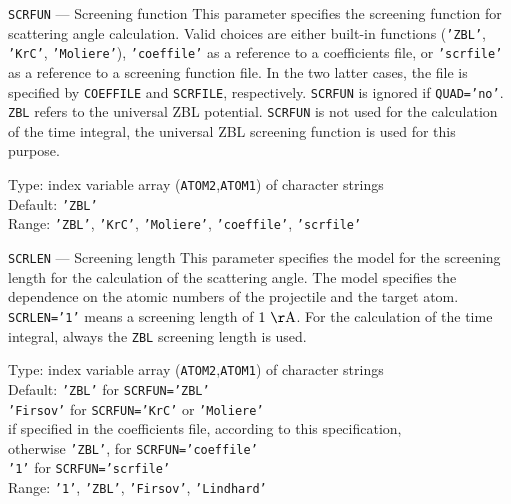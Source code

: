 \begin{keydescription}{\texttt{SCRFUN} --- Screening function}
%
  This parameter specifies the screening function for scattering angle
  calculation. Valid choices are either
  built-in functions (\texttt{'ZBL'}, \texttt{'KrC'}, \texttt{'Moliere'}),
  \texttt{'coeffile'} as a reference to a coefficients file, or 
  \texttt{'scrfile'} as a reference to a screening function file. In the two
  latter cases, the file is specified by \texttt{COEFFILE} and \texttt{SCRFILE},
  respectively. \texttt{SCRFUN} is ignored if \texttt{QUAD='no'}. \texttt{ZBL}
  refers to the universal ZBL potential.  \texttt{SCRFUN} is not used for the 
  calculation of the time integral, the universal ZBL screening function is 
  used for this purpose.
  \begin{keytab}
    Type:    \> index variable array (\texttt{ATOM2},\texttt{ATOM1}) 
                of character strings \\ 
    Default: \> \texttt{'ZBL'} \\
    Range:   \> \texttt{'ZBL'}, \texttt{'KrC'}, \texttt{'Moliere'},
    			\texttt{'coeffile'}, \texttt{'scrfile'}
  \end{keytab}
\end{keydescription}

\begin{keydescription}{\texttt{SCRLEN} --- Screening length}
%
  This parameter specifies the model for the screening length for the
  calculation of the scattering angle. The model specifies the dependence 
  on the atomic numbers of the projectile and the target atom. 
  \texttt{SCRLEN='1'} means a screening length of $1~\rm\AA$. For the
  calculation of the time integral, always the \texttt{ZBL} screening
  length is used.
  \begin{keytab}
    Type:    \> index variable array (\texttt{ATOM2},\texttt{ATOM1}) 
                of character strings \\ 
    Default: \> \texttt{'ZBL'} for \texttt{SCRFUN='ZBL'} \\
             \> \texttt{'Firsov'} for \texttt{SCRFUN='KrC'} or 
                \texttt{'Moliere'} \\
             \> if specified in the coefficients file, according to this 
                specification, \\
             \> otherwise \texttt{'ZBL'}, for \texttt{SCRFUN='coeffile'} \\ 
             \> \texttt{'1'} for \texttt{SCRFUN='scrfile'} \\
    Range:   \> \texttt{'1'}, \texttt{'ZBL'}, \texttt{'Firsov'}, 
                \texttt{'Lindhard'}
  \end{keytab}
\end{keydescription}

